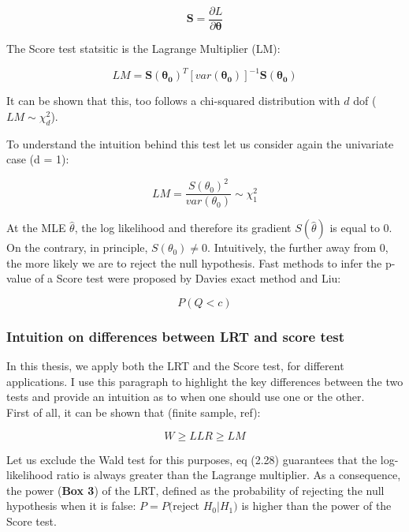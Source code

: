 \begin{equation}
    \mathbf{S} = \frac{\partial L}{\partial \boldsymbol{\theta}}
\end{equation}

The Score test statsitic is the Lagrange Multiplier (LM):

\begin{equation}
    LM = \mathbf{S}(\boldsymbol{\theta_0})^T [var(\boldsymbol{\theta_0})]^{-1}\mathbf{S}(\boldsymbol{\theta_0}) 
\end{equation}

It can be shown that this, too follows a chi-squared distribution with $d$ dof ($LM \sim \chi^2_d$).

To understand the intuition behind this test let us consider again the univariate case (d = 1):

\begin{equation}
    LM = \frac{S(\theta_0)^2}{var(\theta_0)} \sim \chi^2_1
\end{equation}

At the MLE $\hat{\theta}$, the log likelihood and therefore its gradient $S(\hat{\theta})$ is equal to 0.
On the contrary, in principle, $ S(\theta_0) \neq 0 $. 
Intuitively, the further away from 0, the more likely we are to reject the null hypothesis.
Fast methods to infer the p-value of a Score test were proposed by Davies exact method \cite{davies1980algorithm} and Liu:

\begin{equation}
    P(Q<c)
\end{equation}


\subsubsection{Intuition on differences between LRT and score test}

In this thesis, we apply both the LRT and the Score test, for different applications.
I use this paragraph to highlight the key differences between the two tests and provide an intuition as to when one should use one or the other.\\

First of all, it can be shown that (finite sample, ref):

\begin{equation}
    W \geq LLR \geq LM
\end{equation}

Let us exclude the Wald test for this purposes, eq (2.28) guarantees that the log-likelihood ratio is always greater than the Lagrange multiplier.
As a consequence, the power (\textbf{Box 3}) of the LRT, defined as the probability of rejecting the null hypothesis when it is false: $P = P($reject $H_0 | H_1)$ is higher than the power of the Score test.

